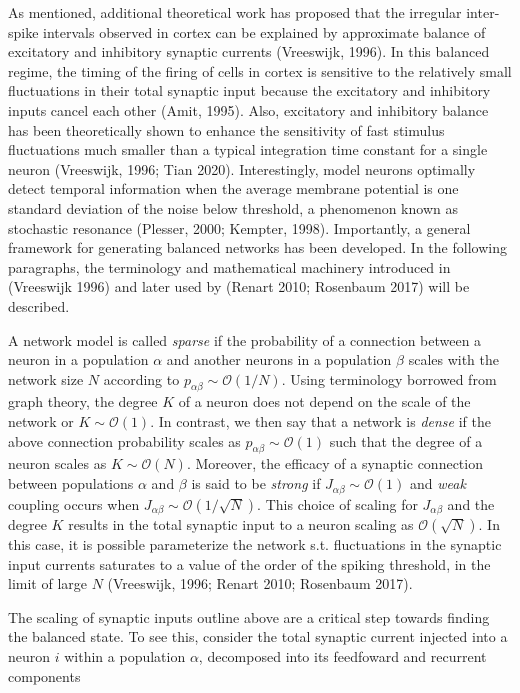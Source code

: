 \documentclass{ucetd}
\begin{document}
As mentioned, additional theoretical work has proposed that the irregular inter-spike intervals observed in cortex can be explained by approximate balance of excitatory and inhibitory synaptic currents (Vreeswijk, 1996). In this balanced regime, the timing of the firing of cells in cortex is sensitive to the relatively small fluctuations in their total synaptic input because the excitatory and inhibitory inputs cancel each other (Amit, 1995). Also, excitatory and inhibitory balance has been theoretically shown to enhance the sensitivity of fast stimulus fluctuations much smaller than a typical integration time constant for a single neuron (Vreeswijk, 1996; Tian 2020). Interestingly, model neurons optimally detect temporal information when the average membrane potential is one standard deviation of the noise below threshold, a phenomenon known as stochastic resonance (Plesser, 2000; Kempter, 1998). Importantly, a general framework for generating balanced networks has been developed. In the following paragraphs, the terminology and mathematical machinery introduced in (Vreeswijk 1996) and later used by (Renart 2010; Rosenbaum 2017) will be described.


A network model is called \emph{sparse} if the probability of a connection between a neuron in a population $\alpha$ and another neurons in a population $\beta$ scales with the network size $N$ according to $p_{\alpha\beta} \sim \mathcal{O}(1/N)$. Using terminology borrowed from graph theory, the degree $K$ of a neuron does not depend on the scale of the network or $K \sim \mathcal{O}(1)$. In contrast, we then say that a network is \emph{dense} if the above connection probability scales as $p_{\alpha\beta} \sim \mathcal{O}(1)$ such that the degree of a neuron scales as $K \sim \mathcal{O}(N)$. Moreover, the efficacy of a synaptic connection between populations $\alpha$ and $\beta$ is said to be \emph{strong} if $J_{\alpha\beta} \sim \mathcal{O}(1)$ and \emph{weak} coupling occurs when $J_{\alpha\beta} \sim \mathcal{O}(1/\sqrt{N})$. This choice of scaling for $J_{\alpha\beta}$ and the degree $K$ results in the total synaptic input to a neuron scaling as $\mathcal{O}(\sqrt{N})$. In this case, it is possible parameterize the network s.t. fluctuations in the synaptic input currents saturates to a value of the order of the spiking threshold, in the limit of large $N$ (Vreeswijk, 1996; Renart 2010; Rosenbaum 2017).  

The scaling of synaptic inputs outline above are a critical step towards finding the balanced state. To see this, consider the total synaptic current injected into a neuron $i$ within a population $\alpha$, decomposed into its feedfoward and recurrent components
\end{document}
